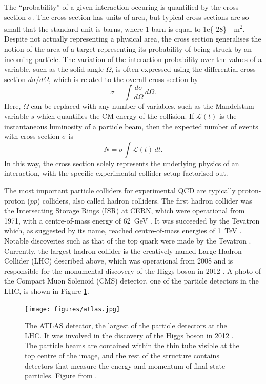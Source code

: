 \documentclass[12pt,a4paper]{report}
\begin{document}
The ``probability'' of a given interaction occuring is quantified by the cross section $\sigma$. The cross section has units of area, but typical cross sections are so small that the standard unit is barns, where 1 barn is equal to \qty{1e{-28}}{\per\square\meter}. Despite not actually representing a physical area, the cross section generalises the notion of the area of a target representing its probability of being struck by an incoming particle. The variation of the interaction probability over the values of a variable, such as the solid angle $\Omega$, is often expressed using the differential cross section $d\sigma / d\Omega$, which is related to the overall cross section by
\begin{equation}
  \sigma = \int \frac{d\sigma}{d\Omega} \, d\Omega.
\end{equation}
Here, $\Omega$ can be replaced with any number of variables, such as the Mandelstam variable $s$ which quantifies the CM energy of the collision. If $\mathcal{L}(t)$ is the instantaneous luminosity of a particle beam, then the expected number of events with cross section $\sigma$ is
\begin{equation}
  N = \sigma \int \mathcal{L}(t) \, dt.
\end{equation}
In this way, the cross section solely represents the underlying physics of an interaction, with the specific experimental collider setup factorised out.

The most important particle colliders for experimental QCD are typically proton-proton ($pp$) colliders, also called hadron colliders. The first hadron collider was the Intersecting Storage Rings (ISR) at CERN, which were operational from 1971, with a centre-of-mass energy of \qty{62}{\giga\electronvolt} \cite{Hubner:2012td,Erhan:1979ba,navas_review_2024}. It was succeeded by the Tevatron which, as suggested by its name, reached centre-of-mass energies of \qty{1}{\tera\electronvolt} \cite{TeVIGroup:1984ewd}. Notable discoveries such as that of the top quark were made by the Tevatron \cite{D0:1995jca,CDF:1995wbb}. Currently, the largest hadron collider is the creatively named Large Hadron Collider (LHC) described above, which was operational from 2008 and is responsible for the monumental discovery of the Higgs boson in 2012 \cite{Evans:2008zzb,atlas_observation_2012}. A photo of the Compact Muon Solenoid (CMS) detector, one of the particle detectors in the LHC, is shown in Figure \ref{fig:atlas}.

\begin{figure}
  \centering
  \texttt{[image: figures/atlas.jpg]}
  \caption{The ATLAS detector, the largest of the particle detectors at the LHC. It was involved in the discovery of the Higgs boson in 2012 \cite{atlas_observation_2012}. The particle beams are contained within the thin tube visible at the top centre of the image, and the rest of the structure contains detectors that measure the energy and momentum of final state particles. Figure from \cite{ATLASimage}.}
  \label{fig:atlas}
\end{figure}
\end{document}
